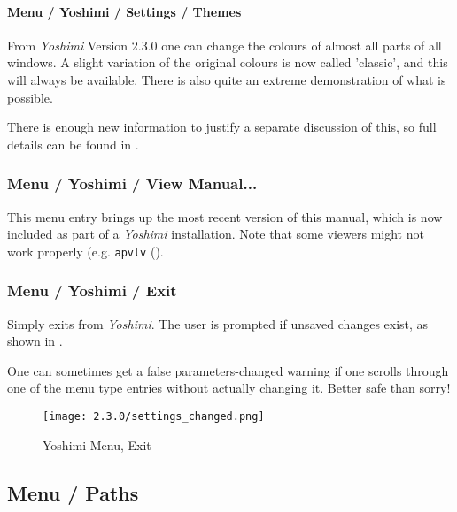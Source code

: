 \paragraph{Menu / Yoshimi / Settings / Themes}
\label{paragraph:menu_yoshimi_settings_themes}
    From \textsl{Yoshimi} Version 2.3.0 one can change the colours of almost
    all parts of all windows. A slight variation of the original colours is now
    called 'classic', and this will always be available. There is also quite an
    extreme demonstration of what is possible.

    There is enough new information to justify a separate discussion of this, so
    full details can be found in \hspace{4pt}.

\subsubsection{Menu / Yoshimi / View Manual...}
\label{subsubsec:menu_yoshimi_view_manual}

   This menu entry brings up the most recent version of this manual, which is
   now included as part of a \textsl{Yoshimi} installation.
   Note that some viewers might not work properly
   (e.g. \texttt{apvlv} (\cite{apvlv}).

\subsubsection{Menu / Yoshimi / Exit}
\label{subsubsec:menu_yoshimi_exit}

   Simply exits from \textsl{Yoshimi}.
   The user is prompted if unsaved changes exist, as shown in
   .

   One can sometimes get a false parameters-changed warning if one
   scrolls through one of the menu type entries without actually changing it.
   Better safe than sorry!

\begin{figure}[H]
   \centering
   \texttt{[image: 2.3.0/settings\_changed.png]}
   \caption[Yoshimi Menu, Exit]{Yoshimi Menu, Exit}
   \label{fig:yoshimi_change_exit}
\end{figure}





\subsection{Menu / Paths}
\label{subsec:menu_paths}

